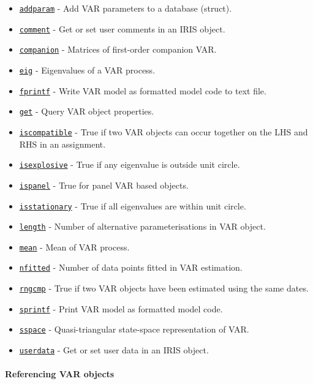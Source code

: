 \begin{itemize}
\itemsep1pt\parskip0pt
\item
  \href{VAR/addparam}{\texttt{addparam}} - Add VAR parameters to a
  database (struct).
\item
  \href{VAR/comment}{\texttt{comment}} - Get or set user comments in an
  IRIS object.
\item
  \href{VAR/companion}{\texttt{companion}} - Matrices of first-order
  companion VAR.
\item
  \href{VAR/eig}{\texttt{eig}} - Eigenvalues of a VAR process.
\item
  \href{VAR/fprintf}{\texttt{fprintf}} - Write VAR model as formatted
  model code to text file.
\item
  \href{VAR/get}{\texttt{get}} - Query VAR object properties.
\item
  \href{VAR/iscompatible}{\texttt{iscompatible}} - True if two VAR
  objects can occur together on the LHS and RHS in an assignment.
\item
  \href{VAR/isexplosive}{\texttt{isexplosive}} - True if any eigenvalue
  is outside unit circle.
\item
  \href{VAR/ispanel}{\texttt{ispanel}} - True for panel VAR based
  objects.
\item
  \href{VAR/isstationary}{\texttt{isstationary}} - True if all
  eigenvalues are within unit circle.
\item
  \href{VAR/length}{\texttt{length}} - Number of alternative
  parameterisations in VAR object.
\item
  \href{VAR/mean}{\texttt{mean}} - Mean of VAR process.
\item
  \href{VAR/nfitted}{\texttt{nfitted}} - Number of data points fitted in
  VAR estimation.
\item
  \href{VAR/rngcmp}{\texttt{rngcmp}} - True if two VAR objects have been
  estimated using the same dates.
\item
  \href{VAR/sprintf}{\texttt{sprintf}} - Print VAR model as formatted
  model code.
\item
  \href{VAR/sspace}{\texttt{sspace}} - Quasi-triangular state-space
  representation of VAR.
\item
  \href{VAR/userdata}{\texttt{userdata}} - Get or set user data in an
  IRIS object.
\end{itemize}

\paragraph{Referencing VAR objects}

